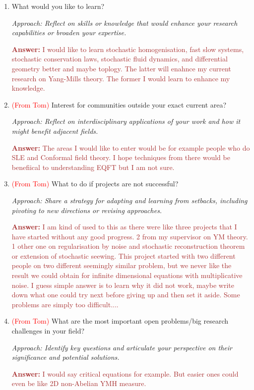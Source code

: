 \documentclass[12pt]{article}
\numberwithin{equation}{section}
\newcommand{\brown}[1]{\textcolor{brown}{#1}}
\newcommand{\red}[1]{\textcolor{red}{#1}}
\begin{document}
\begin{enumerate}
    \item What would you like to learn?
    
    \textit{Approach: Reflect on skills or knowledge that would enhance your research capabilities or broaden your expertise.}

    \brown{\textbf{Answer:} I would like to learn stochastic homogenisation, fast slow systems, stochastic conservation laws, stochastic fluid dynamics, and differential geometry better and maybe toplogy. The latter will enahnce my current research on Yang-Mills theory. The former I would learn to enhance my knowledge.}
    
    \item \red{(From Tom)} Interest for communities outside your exact current area?
    
    \textit{Approach: Reflect on interdisciplinary applications of your work and how it might benefit adjacent fields.}

    \brown{\textbf{Answer:} The areas I would like to enter would be for example people who do SLE and Conformal field theory.  I hope techniques from there would be benefiical to understanding EQFT but I am not sure. 
    }
    \item \red{(From Tom)} What to do if projects are not successful?
    
    \textit{Approach: Share a strategy for adapting and learning from setbacks, including pivoting to new directions or revising approaches.}

    \brown{\textbf{Answer:} I am kind of used to this as there were like three projects that I have started without any good progress. 2 from my supervisor on YM theory. 1 other one on regularisation by noise and stochastic reconstruction theorem or extension of stochastic seewing. This project started with two different people on two different seemingly similar problem, but we never like the result we could obtain for infinite dimensional equations with multiplicative noise. I guess simple answer is to learn why it did not work, maybe write down what one could try next before giving up and then set it aside. Some problems are simply too difficult.... }
    \item \red{(From Tom)} What are the most important open problems/big research challenges in your field?
    
    \textit{Approach: Identify key questions and articulate your perspective on their significance and potential solutions.}

    \brown{\textbf{Answer:} I would say critical equations for example. But easier ones could even be like 2D non-Abelian YMH measure. }
    

\end{enumerate}
\end{document}
